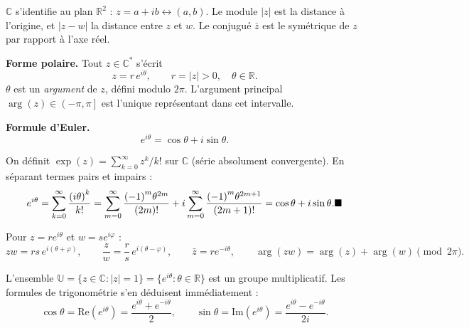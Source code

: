 $\mathbb{C}$ s'identifie au plan $\mathbb{R}^2$ : $z = a+ib \leftrightarrow (a,b)$.
Le module $|z|$ est la distance à l'origine, et $|z-w|$ la distance entre $z$ et $w$.
Le conjugué $\bar z$ est le symétrique de $z$ par rapport à l'axe réel.

\decsep{}


\begin{tcolorbox}[thmbox]
  \textbf{Forme polaire.}\enspace{}
  Tout $z \in \mathbb{C}^*$ s'écrit
  \[
    z = r\,e^{i\theta}, \qquad r = |z| > 0,\quad \theta \in \mathbb{R}.
  \]
  $\theta$ est un \emph{argument} de $z$, défini modulo $2\pi$.
  L'argument principal $\arg(z) \in \left(-\pi,\pi\right]$ est l'unique représentant dans cet intervalle. %

  \medskip
  \textbf{Formule d'Euler.}\enspace{}
  \[
    \boxed{e^{i\theta} = \cos\theta + i\sin\theta.}
  \]
\end{tcolorbox}


\begin{mdframed}[style=proofbar]
  On définit $\exp(z) = \sum_{k=0}^\infty z^k/k!$ sur $\mathbb{C}$ (série absolument convergente). %
  En séparant termes pairs et impairs :
  \[
    e^{i\theta}
    = \sum_{k=0}^\infty \frac{{(i\theta)}^k}{k!}
    = \sum_{m=0}^\infty \frac{{(-1)}^m\theta^{2m}}{(2m)!}
      + i\sum_{m=0}^\infty \frac{{(-1)}^m\theta^{2m+1}}{(2m+1)!}
    = \cos\theta + i\sin\theta.
    \hfill\blacksquare
  \]
\end{mdframed}

Pour $z = re^{i\theta}$ et $w = se^{i\varphi}$ :
\[
  zw = rs\,e^{i(\theta+\varphi)}, \qquad
  \frac{z}{w} = \frac{r}{s}\,e^{i(\theta-\varphi)}, \qquad
  \bar z = re^{-i\theta}, \qquad
  \arg(zw) = \arg(z)+\arg(w) \pmod{2\pi}.
\]

L'ensemble $\mathbb{U} = \{z\in\mathbb{C} : |z|=1\} = \{e^{i\theta}:\theta\in\mathbb{R}\}$
est un groupe multiplicatif. Les formules de trigonométrie s'en déduisent immédiatement :
\[
  \cos\theta = \mathrm{Re}(e^{i\theta}) = \frac{e^{i\theta}+e^{-i\theta}}{2}, \qquad
  \sin\theta = \mathrm{Im}(e^{i\theta}) = \frac{e^{i\theta}-e^{-i\theta}}{2i}.
\]

